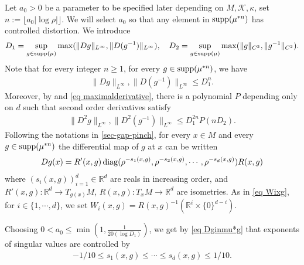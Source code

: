 \documentclass[11pt, leqno, fleqn]{amsart}
\def\maxder{  D_1 }
\def\maxderII{  D_2 }
\newcommand{\SectionSymbol}{\textsection}
\def \R{{\mathbb R}}
\newcommand{\cK}{{\mathcal K}}
\newcommand{\ary}{\begin{eqnarray}}
\newcommand{\eary}{\end{eqnarray}}
\newcommand{\aryst}{\begin{eqnarray*}}
\newcommand{\earyst}{\end{eqnarray*}}
\theoremstyle{definition}
\theoremstyle{definition}
\def\supp{{\rm supp}}
\newcommand{\diag}{\mathop{\rm diag}}
\begin{document}
		 
		 	  
		Let $a_{0}>0$ be a parameter to be specified later depending on $M, \cK, \kappa$, set $n:=\lfloor a_{0}|\log \rho|\rfloor$.	We will select $a_{0}$ so that any element in $\supp(\mu^{*n})$ has controlled distortion. We introduce
		 \begin{align}\label{eq maximalderivative}
		   \maxder = \sup_{g \in \supp(\mu)} \max( \| Dg \|_{L^\infty}, \| D(g^{-1}) \|_{L^\infty} ), \quad \maxderII = \sup_{g \in \supp(\mu)} \max(  \| g \|_{C^2}, \| g^{-1} \|_{C^2} ).
		 \end{align}
		 Note that for every integer $n \geq 1$, for every $g \in \supp(\mu^{*n})$, we have 
		 		 \ary \label{eq Dginmu*g}
		\| Dg \|_{L^\infty}, \| D( g^{-1} ) \|_{L^\infty} \leq \maxder^n.
		 \eary
		 Moreover, by \cite[Lemma 6.4]{FM} and \eqref{eq maximalderivative}, there is a polynomial $P$ depending only on $d$ such that second order derivatives satisfy 
		 \ary \label{eq D2ginmu*g} 
		  \| D^2 g \|_{L^\infty}, \| D^2( g^{-1} ) \|_{L^\infty} \leq \maxder^{2n} P(n \maxderII).
		 \eary
		 Following the notations in \SectionSymbol \ref{sec-gap-pinch}, 
		 for every $x \in M$ and every $g \in  \supp(\mu^{*n})$  the differential map of $g$ at $x$ can be written
		 \aryst
		 Dg(x) = R'(x, g)   \diag(\rho^{ - s_1(x, g) }, \rho^{ - s_2(x, g)}, \cdots, \rho^{ - s_d(x, g)} )   R(x, g)
		 \earyst
		 where   $(s_i(x, g))_{i=1}^d\in \R^d$ are reals in increasing order,		 
		 and $R'(x, g):  \R^d \to T_{g(x)}M$, $R(x, g) :  T_x M \to \R^d$ are isometries. 
		As in \eqref{eq Wixg},  for  $i \in \{1, \cdots, d\}$, we set $W_i(x, g) = R(x, g)^{-1}(\R^{i} \times \{0\}^{d-i})$.
		  
	
		 Choosing $0 < a_{0} \leq    \min(1,   \frac{1}{20 (\log D_{1})})$, we get by \eqref{eq Dginmu*g} that exponents of singular values are controlled by
		 \aryst
		 - 1/10 \leq s_1(x, g) \leq \cdots \leq s_d(x, g) \leq  1/10.
		\earyst
%		
		
\end{document}
